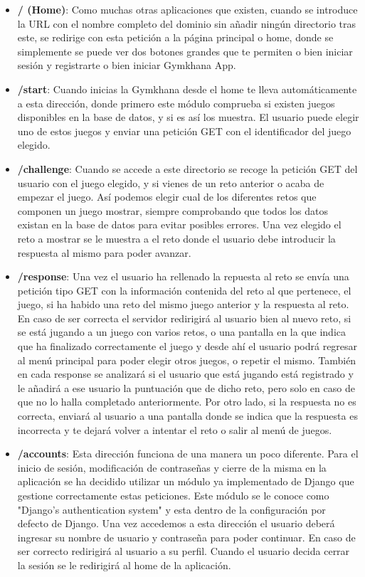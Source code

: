 \documentclass[a4paper, 12pt]{book}
\begin{document}
\begin{itemize}
	\item \textbf {/ (Home)}: Como muchas otras aplicaciones que existen, cuando se introduce la URL con el nombre completo del dominio sin añadir ningún directorio tras este, se redirige con esta petición a la página principal o home, donde se simplemente se puede ver dos botones grandes que te permiten o bien iniciar sesión y registrarte o bien iniciar Gymkhana App. 
	\item \textbf {/start}: Cuando inicias la Gymkhana desde el home te lleva automáticamente a esta dirección, donde primero este módulo comprueba si existen juegos disponibles en la base de datos, y si es así los muestra. El usuario puede elegir uno de estos juegos y enviar una petición GET con el identificador del juego elegido. 
	\item \textbf {/challenge}: Cuando se accede a este directorio se recoge la petición GET del usuario con el juego elegido, y si vienes de un reto anterior o acaba de empezar el juego. Así podemos elegir cual de los diferentes retos que componen un juego mostrar, siempre comprobando que todos los datos existan en la base de datos para evitar posibles errores. Una vez elegido el reto a mostrar se le muestra a el reto donde el usuario debe introducir la respuesta al mismo para poder avanzar. 
	\item \textbf {/response}: Una vez el usuario ha rellenado la repuesta al reto se envía una petición tipo GET con la información contenida del reto al que pertenece, el juego, si ha habido una reto del mismo juego anterior y la respuesta al reto. En caso de ser correcta el servidor redirigirá al usuario bien al nuevo reto, si se está jugando a un juego con varios retos, o una pantalla en la que indica que ha finalizado correctamente el juego y desde ahí el usuario podrá regresar al menú principal para poder elegir otros juegos, o repetir el mismo. También en cada response se analizará si el usuario que está jugando está registrado y le añadirá a ese usuario la puntuación que de dicho reto, pero solo en caso de que no lo halla completado anteriormente. Por otro lado, si la respuesta no es correcta, enviará al usuario a una pantalla donde se indica que la respuesta es incorrecta y te dejará volver a intentar el reto o salir al menú de juegos.
	\item \textbf {/accounts}: Esta dirección funciona de una manera un poco diferente. Para el inicio de sesión, modificación de contraseñas y cierre de la misma en la aplicación se ha decidido utilizar un módulo ya implementado de Django que gestione correctamente estas peticiones. Este módulo se le conoce como "Django’s authentication system" y esta dentro de la configuración por defecto de Django. Una vez accedemos a esta dirección el usuario deberá ingresar su nombre de usuario y contraseña para poder continuar. En caso de ser correcto redirigirá al usuario a su perfil. Cuando el usuario decida cerrar la sesión se le redirigirá al home de la aplicación. 

\end{itemize}
\end{document}
